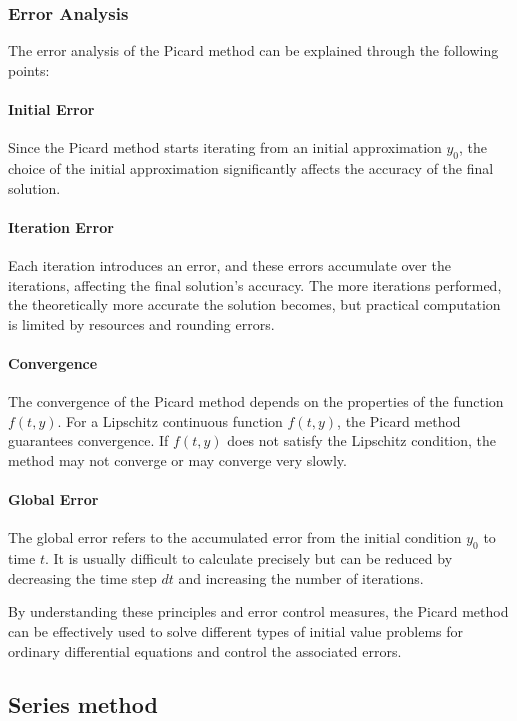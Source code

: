 \documentclass{article}
\begin{document}
\subsubsection{Error Analysis}

The error analysis of the Picard method can be explained through the following points:

\paragraph{Initial Error}
Since the Picard method starts iterating from an initial approximation \( y_0 \), the choice of the initial approximation significantly affects the accuracy of the final solution.

\paragraph{Iteration Error}
Each iteration introduces an error, and these errors accumulate over the iterations, affecting the final solution's accuracy. The more iterations performed, the theoretically more accurate the solution becomes, but practical computation is limited by resources and rounding errors.

\paragraph{Convergence}
The convergence of the Picard method depends on the properties of the function \( f(t, y) \). For a Lipschitz continuous function \( f(t, y) \), the Picard method guarantees convergence. If \( f(t, y) \) does not satisfy the Lipschitz condition, the method may not converge or may converge very slowly.

\paragraph{Global Error}
The global error refers to the accumulated error from the initial condition \( y_0 \) to time \( t \). It is usually difficult to calculate precisely but can be reduced by decreasing the time step \( dt \) and increasing the number of iterations.

By understanding these principles and error control measures, the Picard method can be effectively used to solve different types of initial value problems for ordinary differential equations and control the associated errors.


\subsection{Series method}
\end{document}

